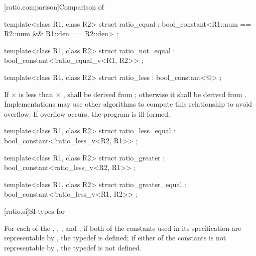 [ratio.comparison]{Comparison of }

%
\begin{itemdecl}
template<class R1, class R2>
  struct ratio_equal : bool_constant<R1::num == R2::num && R1::den == R2::den> { };
\end{itemdecl}

%
\begin{itemdecl}
template<class R1, class R2>
  struct ratio_not_equal : bool_constant<!ratio_equal_v<R1, R2>> { };
\end{itemdecl}

%
\begin{itemdecl}
template<class R1, class R2>
  struct ratio_less : bool_constant<@\seebelow@> { };
\end{itemdecl}

\begin{itemdescr}
\pnum
If  $\times$  is less than  $\times$ ,
 shall be
derived from ; otherwise it shall be derived from
. Implementations may use other algorithms to
compute this relationship to avoid overflow. If overflow occurs, the program is ill-formed.
\end{itemdescr}

%
\begin{itemdecl}
template<class R1, class R2>
  struct ratio_less_equal : bool_constant<!ratio_less_v<R2, R1>> { };
\end{itemdecl}

%
\begin{itemdecl}
template<class R1, class R2>
  struct ratio_greater : bool_constant<ratio_less_v<R2, R1>> { };
\end{itemdecl}

%
\begin{itemdecl}
template<class R1, class R2>
  struct ratio_greater_equal : bool_constant<!ratio_less_v<R1, R2>> { };
\end{itemdecl}

[ratio.si]{SI types for }

\pnum
For each of the  , ,
, and , if both of the constants used in its
specification are representable by , the typedef is
defined; if either of the constants is not representable by ,
the typedef is not defined.

